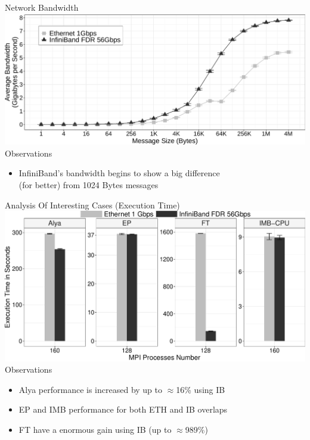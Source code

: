 \documentclass{beamer}
\begin{document}
\begin{frame}{Network Bandwidth}
\includegraphics[width=\textwidth]{SLIDES/img/Bandwidth.pdf}
\vfill
\pause Observations
\begin{itemize}
    \item InfiniBand's bandwidth begins to show a \alert{big difference} \\(for better) from 1024 Bytes messages
\end{itemize}
\end{frame}

\begin{frame}{Analysis Of Interesting Cases (Execution Time)}
\includegraphics[width=\textwidth]{SLIDES/img/FT-EP-Alya-IMB.pdf}
\pause Observations
\begin{itemize}
    \item Alya performance is increased by up to \alert{$\approx$16\%} using IB
    \pause\item EP and IMB performance for both ETH and IB \alert{overlaps}
    \pause\item FT have a enormous gain using IB (\alert{up to $\approx$989\%})
\end{itemize}
\end{frame}
\end{document}
